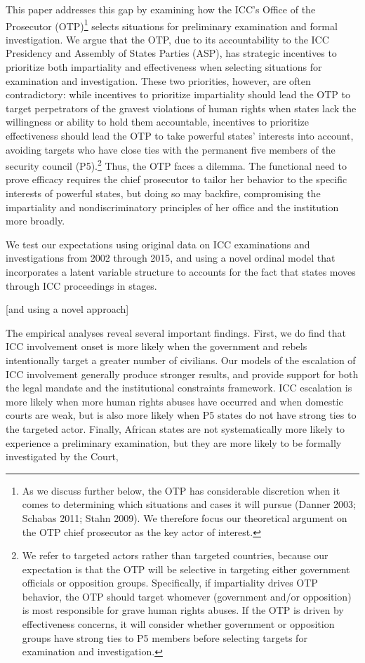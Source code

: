 This paper addresses this gap by examining how the ICC's Office of the Prosecutor (OTP)\footnote{As we discuss further below, the OTP has considerable discretion when it comes to determining which situations and cases it will pursue (Danner 2003; Schabas 2011; Stahn 2009). We therefore focus our theoretical argument on the OTP chief prosecutor as the key actor of interest.} selects situations for preliminary examination and formal investigation. We argue that the OTP, due to its accountability to the ICC Presidency and Assembly of States Parties (ASP), has strategic incentives to prioritize both impartiality and effectiveness when selecting situations for examination and investigation. These two priorities, however, are often contradictory: while incentives to prioritize impartiality should lead the OTP to target perpetrators of the gravest violations of human rights when states lack the willingness or ability to hold them accountable, incentives to prioritize effectiveness should lead the OTP to take powerful states' interests into account, avoiding targets who have close ties with the permanent five members of the security council (P5).\footnote{We refer to targeted actors rather than targeted countries, because our expectation is that the OTP will be selective in targeting either government officials or opposition groups. Specifically, if impartiality drives OTP behavior, the OTP should target whomever (government and/or opposition) is most responsible for grave human rights abuses. If the OTP is driven by effectiveness concerns, it will consider whether government or opposition groups have strong ties to P5 members before selecting targets for examination and investigation.} Thus, the OTP faces a dilemma. The functional need to prove efficacy requires the chief prosecutor to tailor her behavior to the specific interests of powerful states, but doing so may backfire, compromising the impartiality and nondiscriminatory principles of her office and the institution more broadly.

We test our expectations using original data on ICC examinations and investigations from 2002 through 2015, and using a novel ordinal model that incorporates a latent variable structure to accounts for the fact that states moves through ICC proceedings in stages. 

[and using a novel approach]

The empirical analyses reveal several important findings. First, we do find that ICC involvement onset is more likely when the government and rebels intentionally target a greater number of civilians. Our models of the escalation of ICC involvement generally produce stronger results, and provide support for both the legal mandate and the institutional constraints framework. ICC escalation is more likely when more human rights abuses have occurred and when domestic courts are weak, but is also more likely when P5 states do not have strong ties to the targeted actor. Finally, African states are not systematically more likely to experience a preliminary examination, but they are more likely to be formally investigated by the Court, 

